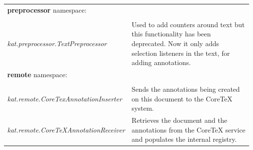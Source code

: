 \documentclass[a4paper, 12pt, notitlepage]{report}
\begin{document}
\begin{tabular}{p{6cm} | p{8cm} }
 \textbf{preprocessor} namespace: \\\\ \hline
 \textit{kat.preprocessor.TextPreprocessor} & Used to add counters around text but this functionality has been deprecated. Now it only adds selection listeners in the text, for adding annotations.\\ \hline
 \textbf{remote} namespace: \\\\ \hline
 \textit{kat.remote.CoreTexAnnotationInserter} & Sends the annotations being created on this document to the CoreTeX system.\\ \hline
 \textit{kat.remote.CoreTeXAnnotationReceiver} & Retrieves the document and the annotations from the CoreTeX service and populates the internal registry. \\ \hline

\end{tabular}
\end{document}
